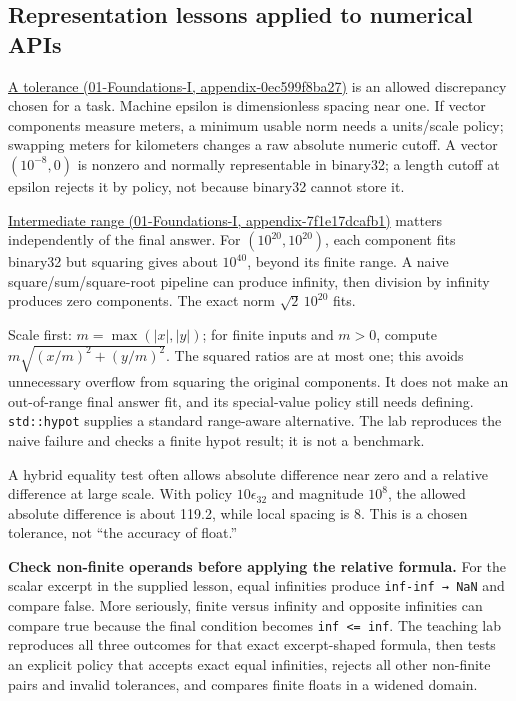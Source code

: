 \subsection{Representation lessons applied to numerical APIs}\label{05-engine-i-ch001-representation-lessons-applied-to-numerical-apis}

\href{../01-Foundations-I/main.pdf\#nameddest=appendix-0ec599f8ba27}{A tolerance (01-Foundations-I, appendix-0ec599f8ba27)} is an allowed discrepancy chosen for a task. Machine epsilon is dimensionless spacing near one. If vector components measure meters, a minimum usable norm needs a units/scale policy; swapping meters for kilometers changes a raw absolute numeric cutoff. A vector \((10^{-8},0)\) is nonzero and normally representable in binary32; a length cutoff at epsilon rejects it by policy, not because binary32 cannot store it.

\href{../01-Foundations-I/main.pdf\#nameddest=appendix-7f1e17dcafb1}{Intermediate range (01-Foundations-I, appendix-7f1e17dcafb1)} matters independently of the final answer. For \((10^{20},10^{20})\), each component fits binary32 but squaring gives about \(10^{40}\), beyond its finite range. A naive square/sum/square-root pipeline can produce infinity, then division by infinity produces zero components. The exact norm \(\sqrt2\,10^{20}\) fits.

Scale first: \(m=\max(|x|,|y|)\); for finite inputs and \(m>0\), compute \(m\sqrt{(x/m)^2+(y/m)^2}\). The squared ratios are at most one; this avoids unnecessary overflow from squaring the original components. It does not make an out-of-range final answer fit, and its special-value policy still needs defining. \texttt{std::hypot} supplies a standard range-aware alternative. The lab reproduces the naive failure and checks a finite hypot result; it is not a benchmark.

A hybrid equality test often allows absolute difference near zero and a relative difference at large scale. With policy \(10\epsilon_{32}\) and magnitude \(10^8\), the allowed absolute difference is about 119.2, while local spacing is 8. This is a chosen tolerance, not ``the accuracy of float.''

\textbf{Check non-finite operands before applying the relative formula.} For the scalar excerpt in the supplied lesson, equal infinities produce \texttt{inf-inf\ →\ NaN} and compare false. More seriously, finite versus infinity and opposite infinities can compare true because the final condition becomes \texttt{inf\ \textless{}=\ inf}. The teaching lab reproduces all three outcomes for that exact excerpt-shaped formula, then tests an explicit policy that accepts exact equal infinities, rejects all other non-finite pairs and invalid tolerances, and compares finite floats in a widened domain.

